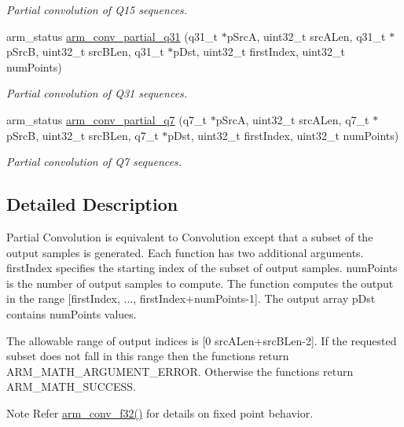 \begin{DoxyCompactItemize}
\begin{DoxyCompactList}\small\item\em Partial convolution of Q15 sequences. \end{DoxyCompactList}\item 
arm\-\_\-status \hyperlink{group___partial_conv_ga78e73a5f02d103168a09821fb461e77a}{arm\-\_\-conv\-\_\-partial\-\_\-q31} (q31\-\_\-t $\ast$p\-Src\-A, uint32\-\_\-t src\-A\-Len, q31\-\_\-t $\ast$p\-Src\-B, uint32\-\_\-t src\-B\-Len, q31\-\_\-t $\ast$p\-Dst, uint32\-\_\-t first\-Index, uint32\-\_\-t num\-Points)
\begin{DoxyCompactList}\small\item\em Partial convolution of Q31 sequences. \end{DoxyCompactList}\item 
arm\-\_\-status \hyperlink{group___partial_conv_ga8567259fe18396dd972242c41741ebf4}{arm\-\_\-conv\-\_\-partial\-\_\-q7} (q7\-\_\-t $\ast$p\-Src\-A, uint32\-\_\-t src\-A\-Len, q7\-\_\-t $\ast$p\-Src\-B, uint32\-\_\-t src\-B\-Len, q7\-\_\-t $\ast$p\-Dst, uint32\-\_\-t first\-Index, uint32\-\_\-t num\-Points)
\begin{DoxyCompactList}\small\item\em Partial convolution of Q7 sequences. \end{DoxyCompactList}\end{DoxyCompactItemize}


\subsection{Detailed Description}
Partial Convolution is equivalent to Convolution except that a subset of the output samples is generated. Each function has two additional arguments. {\ttfamily first\-Index} specifies the starting index of the subset of output samples. {\ttfamily num\-Points} is the number of output samples to compute. The function computes the output in the range {\ttfamily \mbox{[}first\-Index, ..., first\-Index+num\-Points-\/1\mbox{]}}. The output array {\ttfamily p\-Dst} contains {\ttfamily num\-Points} values.

The allowable range of output indices is \mbox{[}0 src\-A\-Len+src\-B\-Len-\/2\mbox{]}. If the requested subset does not fall in this range then the functions return A\-R\-M\-\_\-\-M\-A\-T\-H\-\_\-\-A\-R\-G\-U\-M\-E\-N\-T\-\_\-\-E\-R\-R\-O\-R. Otherwise the functions return A\-R\-M\-\_\-\-M\-A\-T\-H\-\_\-\-S\-U\-C\-C\-E\-S\-S. \begin{DoxyNote}{Note}
Refer \hyperlink{group___conv_ga3f860dc98c6fc4cafc421e4a2aed3c89}{arm\-\_\-conv\-\_\-f32()} for details on fixed point behavior. 
\end{DoxyNote}


